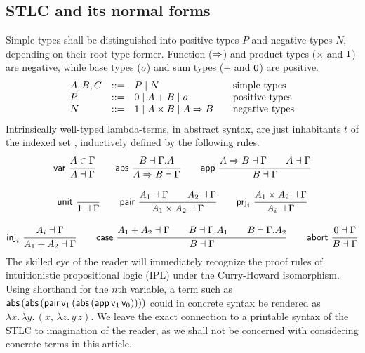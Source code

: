 \documentclass[a4paper,USenglish,cleveref, autoref]{lipics-v2019}
\begin{document}
\subsection{STLC and its normal forms}

Simple types shall be distinguished into positive types $P$ and
negative types $N$, depending on their root type former.  Function
($\Rightarrow$) and product types ($\times$ and $1$) are negative,
while base types ($o$) and sum types ($+$ and $0$) are positive.
\[
\begin{array}{lrl@{\qquad}l}
  A,B,C & ::= & P \mid N & \mbox{simple types} \\
  P     & ::= & \tyzero \mid A + B \mid \tybase & \mbox{positive types} \\
  N     & ::= & \tyone \mid A \times B \mid A \To B
    & \mbox{negative types} \\
\end{array}
\]
Intrinsically well-typed lambda-terms, in abstract syntax,
are just inhabitants $t$ of the indexed set ,
inductively defined by the following rules.
\begin{gather*}
  \nru{\tvar}{A \in \Gamma}{A \from \Gamma}
\qquad
  \nru{\tabs}{B \from \cext \Gamma A}{A \To B \from \Gamma}
\qquad
  \nru{\tapp}
    {A \To B \from \Gamma \qquad A \from \Gamma}
    {B \from \Gamma}
\\[2ex]
  \nru{\tunit}{}{\tyone \from \Gamma}
\qquad
  \nru{\tpair}
    {A_1 \from \Gamma \qquad A_2 \from \Gamma}
    {A_1 \times A_2 \from \Gamma}
\qquad
  \nru{\tprj_i}
    {A_1 \times A_2 \from \Gamma}
    {A_i \from \Gamma}
\\[2ex]
  \nru{\tinj_i}
    {A_i \from \Gamma}
    {A_1 + A_2 \from \Gamma}
\qquad
  \nru{\tcase}
    {A_1 + A_2 \from \Gamma
      \qquad B \from \cext \Gamma A_1
      \qquad B \from \cext \Gamma A_2
    }{B \from \Gamma}
\qquad
  \nru{\tabort}
    {\tyzero \from \Gamma}
    {B \from \Gamma}
\end{gather*}
The skilled eye of the reader will immediately recognize the proof
rules of intuitionistic propositional logic (IPL) under the
Curry-Howard isomorphism.  Using shorthand
 for the $n$th variable,
a term such as
\(
  \mathsf{abs}\,(\mathsf{abs}\,(\mathsf{pair}\,
    \mathsf{v}_{1}\,
    (\mathsf{abs}\,(\mathsf{app}\,\mathsf{v}_{1}\,\mathsf{v}_{0}))))
\)
could in concrete syntax be rendered as
\(
  \lambda x.\,\lambda y.\,(x,\,\lambda z.\,y\,z)
  .
\)
We leave the exact connection to a printable
syntax of the STLC to imagination of the reader,
as we shall not be concerned with considering
concrete terms in this article.
\end{document}
